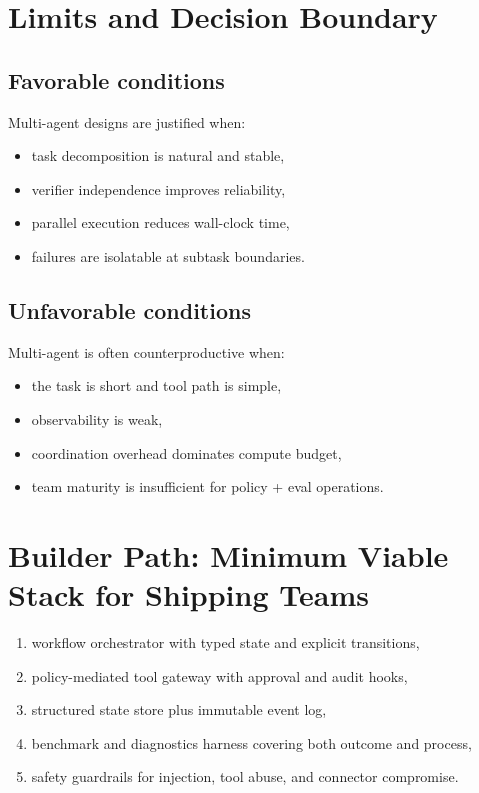 \documentclass[11pt]{article}
\begin{document}
\section{Limits and Decision Boundary}
\subsection{Favorable conditions}
Multi-agent designs are justified when:
\begin{itemize}[leftmargin=1.2em]
  \item task decomposition is natural and stable,
  \item verifier independence improves reliability,
  \item parallel execution reduces wall-clock time,
  \item failures are isolatable at subtask boundaries.
\end{itemize}

\subsection{Unfavorable conditions}
Multi-agent is often counterproductive when:
\begin{itemize}[leftmargin=1.2em]
  \item the task is short and tool path is simple,
  \item observability is weak,
  \item coordination overhead dominates compute budget,
  \item team maturity is insufficient for policy + eval operations.
\end{itemize}

\section{Builder Path: Minimum Viable Stack for Shipping Teams}
\begin{enumerate}[leftmargin=1.2em]
  \item workflow orchestrator with typed state and explicit transitions,
  \item policy-mediated tool gateway with approval and audit hooks,
  \item structured state store plus immutable event log,
  \item benchmark and diagnostics harness covering both outcome and process,
  \item safety guardrails for injection, tool abuse, and connector compromise.
\end{enumerate}
\end{document}

